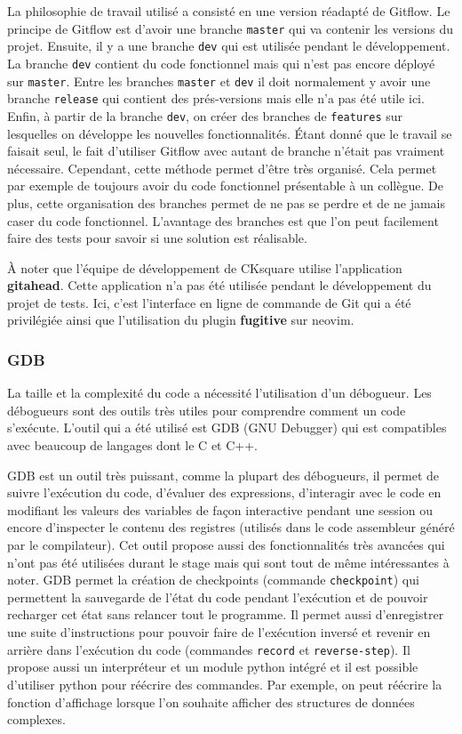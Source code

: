 \documentclass[a4paper]{article}
\begin{document}
La philosophie de travail utilisé a consisté en une version réadapté de Gitflow.
Le principe de Gitflow est d'avoir une branche \verb|master| qui va
contenir les versions du projet. Ensuite, il y a une branche \verb|dev| qui
est utilisée pendant le développement. La branche \verb|dev| contient du
code fonctionnel mais qui n'est pas encore déployé sur \verb|master|. Entre
les branches \verb|master| et \verb|dev| il doit normalement y avoir
une branche \verb|release| qui contient des prés-versions mais elle n'a pas
été utile ici. Enfin, à partir de la branche \verb|dev|, on créer des
branches de \verb|features| sur lesquelles on développe les nouvelles
fonctionnalités. Étant donné que le travail se faisait seul, le fait d'utiliser
Gitflow avec autant de branche n'était pas vraiment nécessaire. Cependant, cette
méthode permet d'être très organisé. Cela permet par exemple de toujours avoir
du code fonctionnel présentable à un collègue. De plus, cette organisation des
branches permet de ne pas se perdre et de ne jamais caser du code fonctionnel.
L'avantage des branches est que l'on peut facilement faire des tests pour savoir
si une solution est réalisable.

À noter que l'équipe de développement de CKsquare utilise l'application
\textbf{gitahead}. Cette application n'a pas été utilisée pendant le
développement du projet de tests. Ici, c'est l'interface en ligne de commande de Git
qui a été privilégiée ainsi que l'utilisation du plugin \textbf{fugitive} sur
neovim.
\subsubsection{GDB}%

La taille et la complexité du code a nécessité l'utilisation d'un débogueur. Les
débogueurs sont des outils très utiles pour comprendre comment un code
s'exécute. L'outil qui a été utilisé est GDB (GNU Debugger) qui est compatibles
avec beaucoup de langages dont le C et C++.

GDB est un outil très puissant, comme la plupart des débogueurs, il permet de
suivre l'exécution du code, d'évaluer des expressions, d'interagir avec le code
en modifiant les valeurs des variables de façon interactive pendant une session
ou encore d'inspecter le contenu des registres (utilisés dans le code assembleur
généré par le compilateur). Cet outil propose aussi des fonctionnalités très
avancées qui n'ont pas été utilisées durant le stage mais qui sont tout de même
intéressantes à noter. GDB permet la création de checkpoints (commande
\verb|checkpoint|) qui permettent la sauvegarde de l'état du code pendant
l'exécution et de pouvoir recharger cet état sans relancer tout le programme. Il
permet aussi d'enregistrer une suite d'instructions pour pouvoir faire de
l'exécution inversé et revenir en arrière dans l'exécution du code (commandes
\verb|record| et \verb|reverse-step|). Il propose aussi un interpréteur et un
module python intégré et il est possible d'utiliser python pour réécrire des
commandes. Par exemple, on peut réécrire la fonction d'affichage lorsque l'on
souhaite afficher des structures de données complexes.
\end{document}
